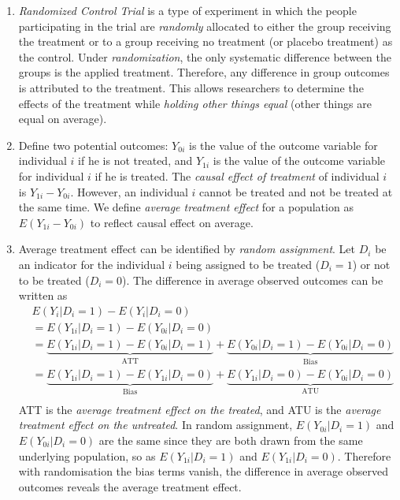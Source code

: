 \documentclass{article}
\begin{document}
\begin{enumerate}
    \item \textit{Randomized Control Trial} is a type of experiment in which the people participating in the trial are \textit{randomly} allocated to either the group receiving the treatment or to a group receiving no treatment (or placebo treatment) as the control.
    Under \textit{randomization}, the only systematic difference between the groups is the applied treatment. Therefore, any difference in group outcomes is attributed to the treatment. This allows researchers to determine the effects of the treatment while \textit{holding other things equal} (other things are equal on average). 
    
    \item Define two potential outcomes: $Y_{0i}$ is the value of the outcome variable for individual $i$ if he is not treated, and $Y_{1i}$ is the value of the outcome variable for individual $i$ if he is treated. The \textit{causal effect of treatment} of individual $i$ is $Y_{1i} - Y_{0i}$. However, an individual $i$ cannot be treated and not be treated at the same time. We define \textit{average treatment effect} for a population as $E(Y_{1i} - Y_{0i})$ to reflect causal effect on average. 

    \item Average treatment effect can be identified by \textit{random assignment}. Let $D_i$ be an indicator for the individual $i$ being assigned to be treated ($D_i=1$) or not to be treated ($D_i=0$). The difference in average observed outcomes can be written as 
        \begin{align*}
            &  E(Y_i | D_i=1) - E(Y_i | D_i=0) \\
            &= E(Y_{1i} | D_i=1) - E(Y_{0i} | D_i=0) \\
            &= \underbrace{E(Y_{1i} | D_i=1) - E(Y_{0i} | D_i=1)}_\textrm{ATT} 
             + \underbrace{E(Y_{0i} | D_i=1) - E(Y_{0i} | D_i=0)}_\textrm{Bias} \\
            &= \underbrace{E(Y_{1i} | D_i=1) - E(Y_{1i} | D_i=0)}_\textrm{Bias} 
             + \underbrace{E(Y_{1i} | D_i=0) - E(Y_{0i} | D_i=0)}_\textrm{ATU} \\
        \end{align*}
    ATT is the \textit{average treatment effect on the treated}, and ATU is the \textit{average treatment effect on the untreated}. In random assignment, $E(Y_{0i} | D_i=1)$ and $E(Y_{0i} | D_i=0)$ are the same since they are both drawn from the same underlying population, so as $E(Y_{1i} | D_i=1)$ and $E(Y_{1i} | D_i=0)$. Therefore with randomisation the bias terms vanish, the difference in average observed outcomes reveals the average treatment effect. 
    

\end{enumerate}
\end{document}
